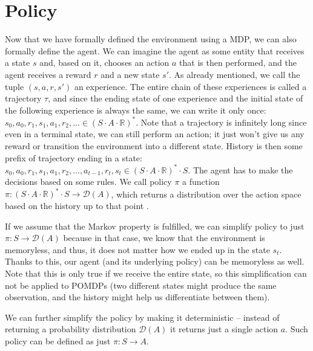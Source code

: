 \documentclass[
  digital,     %
  oneside,     %
  nosansbold,  %
  nocolorbold, %
  lof,         %
  lot,         %
]{fithesis4}
\begin{document}
\section{Policy}
Now that we have formally defined the environment using a MDP, we can also formally define the agent. We can imagine the agent as some entity that receives a state $s$ and, based on it, chooses an action $a$ that is then performed, and the agent receives a reward $r$ and a new state $s'$. As already mentioned, we call the tuple $(s, a, r, s')$ an experience. The entire chain of these experiences is called a trajectory $\tau$, and since the ending state of one experience and the initial state of the following experience is always the same, we can write it only once: $s_0,a_0,r_1,s_1,a_1,r_2,\dotsc \in (S\cdot A \cdot \mathbb{R})^{*}$. Note that a trajectory is infinitely long since even in a terminal state, we can still perform an action; it just won't give us any reward or transition the environment into a different state. History is then some prefix of trajectory ending in a state: $s_0,a_0,r_1,s_1,a_1,r_2,\dotsc, a_{t-1},r_t,s_t\in (S\cdot A \cdot \mathbb{R})^{*}\cdot S$. The agent has to make the decisions based on some rules. We call policy $\pi$ a function $\pi\colon (S\cdot A \cdot \mathbb{R})^{*}\cdot S \to \mathcal{D}(A)$, which returns a distribution over the action space based on the history up to that point \cite[p. 19]{PA230}.

If we assume that the Markov property is fulfilled, we can simplify policy to just $\pi\colon S \to \mathcal{D}(A)$ because in that case, we know that the environment is memoryless, and thus, it does not matter how we ended up in the state $s_t$. Thanks to this, our agent (and its underlying policy) can be memoryless as well. Note that this is only true if we receive the entire state, so this simplification can not be applied to POMDPs (two different states might produce the same observation, and the history might help us differentiate between them).

We can further simplify the policy by making it deterministic -- instead of returning a probability distribution $\mathcal{D}(A)$ it returns just a single action $a$. Such policy can be defined as just $\pi\colon S \to A$.
\end{document}
